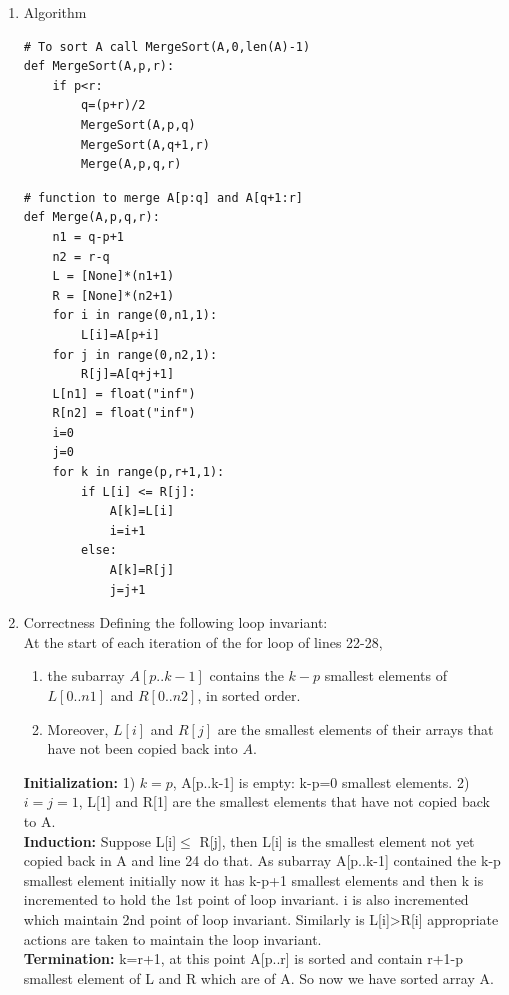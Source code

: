 \documentclass[11pt]{article}
\begin{document}
\begin{enumerate}
\item Algorithm
\label{sec:orgcc5e894}
\begin{verbatim}
# To sort A call MergeSort(A,0,len(A)-1)
def MergeSort(A,p,r):
    if p<r:
        q=(p+r)/2
        MergeSort(A,p,q)
        MergeSort(A,q+1,r)
        Merge(A,p,q,r)
\end{verbatim}

\begin{verbatim}
# function to merge A[p:q] and A[q+1:r]
def Merge(A,p,q,r):
    n1 = q-p+1
    n2 = r-q
    L = [None]*(n1+1)
    R = [None]*(n2+1)
    for i in range(0,n1,1):
        L[i]=A[p+i]
    for j in range(0,n2,1):
        R[j]=A[q+j+1]
    L[n1] = float("inf")
    R[n2] = float("inf")
    i=0
    j=0
    for k in range(p,r+1,1):
        if L[i] <= R[j]:
            A[k]=L[i]
            i=i+1
        else:
            A[k]=R[j]
            j=j+1
\end{verbatim}

\item Correctness
\label{sec:org1523936}
Defining the following loop invariant: \\
At the start of each iteration of the for loop of lines 22-28,
\begin{enumerate}
\item the subarray \(A[p..k-1]\) contains the \(k-p\) smallest elements of \(L[0..n1]\) and \(R[0..n2]\), in sorted order.
\item Moreover, \(L[i]\) and \(R[j]\) are the smallest elements of their arrays that have not been copied back into \(A\). \\
\end{enumerate}

\textbf{Initialization:} 1) \(k=p\),  A[p..k-1] is empty: k-p=0 smallest elements.
2)\(i=j=1\), L[1] and R[1] are the smallest elements that have not copied back to A. \\

\textbf{Induction:} Suppose L[i]\(\le\) R[j], then L[i] is the smallest element not yet copied back in A and line 24 do that. 
As subarray A[p..k-1] contained the k-p smallest element initially now it has k-p+1 smallest elements and then k is incremented
to hold the 1st point of loop invariant. i is also incremented which maintain 2nd point of loop invariant. Similarly is L[i]>R[i]
appropriate actions are taken to maintain the loop invariant. \\

\textbf{Termination:} k=r+1, at this point A[p..r] is sorted and contain r+1-p smallest element of L and R which are of A. So now 
we have sorted array A.


\end{enumerate}
\end{document}
